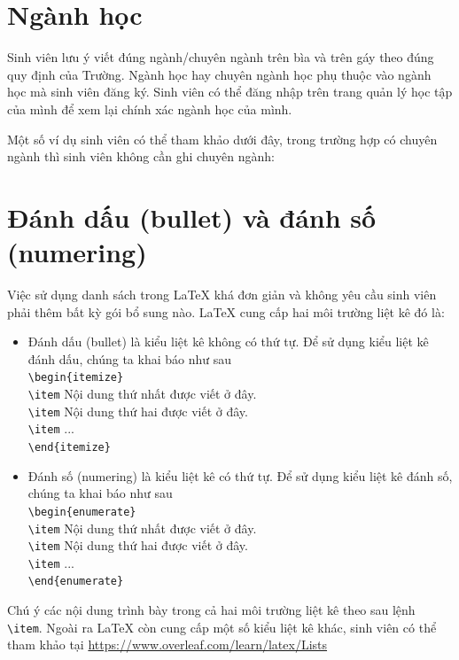 \documentclass[../DoAn.tex]{subfiles}
\begin{document}
\section{Ngành học}
Sinh viên lưu ý viết đúng ngành/chuyên ngành trên bìa và trên gáy theo đúng quy định của Trường. Ngành học hay chuyên ngành học phụ thuộc vào ngành học mà sinh viên đăng ký. Sinh viên có thể đăng nhập trên trang quản lý học tập của mình để xem lại chính xác ngành học của mình. 

Một số ví dụ sinh viên có thể tham khảo dưới đây, trong trường hợp có chuyên ngành thì sinh viên không cần ghi chuyên ngành:


\section{Đánh dấu (bullet) và đánh số (numering)}
Việc sử dụng danh sách trong LaTeX khá đơn giản và không yêu cầu sinh viên phải thêm bất kỳ gói bổ sung nào. LaTeX cung cấp hai môi trường liệt kê đó là:
\begin{itemize}
\item Đánh dấu (bullet) là kiểu liệt kê không có thứ tự. Để sử dụng kiểu liệt kê đánh dấu, chúng ta khai báo như sau\\ 
\verb$\begin{itemize}$\\
 \verb$\item$ Nội dung thứ nhất được viết ở đây.\\
\verb$\item$ Nội dung thứ hai được viết ở đây.\\
 \verb$\item$ ...\\
\verb$\end{itemize}$
\item Đánh số (numering) là kiểu liệt kê có thứ tự. Để sử dụng kiểu liệt kê đánh số, chúng ta khai báo như sau\\
\verb$\begin{enumerate}$\\
 \verb$\item$ Nội dung thứ nhất được viết ở đây.\\
\verb$\item$ Nội dung thứ hai được viết ở đây.\\
 \verb$\item$ ...\\
\verb$\end{enumerate}$
\end{itemize}
Chú ý các nội dung trình bày trong cả hai môi trường liệt kê theo sau lệnh \verb$\item$. Ngoài ra LaTeX còn cung cấp một số kiểu liệt kê khác, sinh viên có thể tham khảo tại \url{https://www.overleaf.com/learn/latex/Lists}
\end{document}
